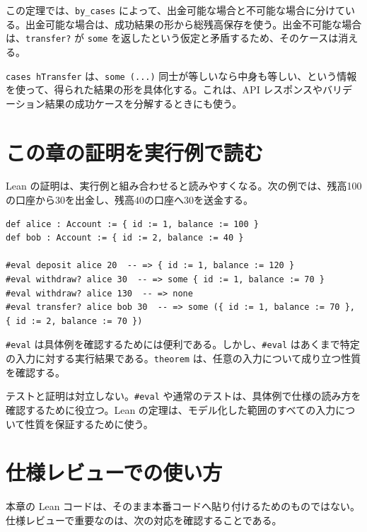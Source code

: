 この定理では、\texttt{by\_cases} によって、出金可能な場合と不可能な場合に分けている。出金可能な場合は、成功結果の形から総残高保存を使う。出金不可能な場合は、\texttt{transfer?} が \texttt{some} を返したという仮定と矛盾するため、そのケースは消える。

\begin{leanbox}
\texttt{cases hTransfer} は、\texttt{some (...)} 同士が等しいなら中身も等しい、という情報を使って、得られた結果の形を具体化する。これは、API レスポンスやバリデーション結果の成功ケースを分解するときにも使う。
\end{leanbox}

\section{この章の証明を実行例で読む}

Lean の証明は、実行例と組み合わせると読みやすくなる。次の例では、残高100の口座から30を出金し、残高40の口座へ30を送金する。

\begin{listing}[htbp]
\begin{verbatim}
def alice : Account := { id := 1, balance := 100 }
def bob : Account := { id := 2, balance := 40 }

#eval deposit alice 20  -- => { id := 1, balance := 120 }
#eval withdraw? alice 30  -- => some { id := 1, balance := 70 }
#eval withdraw? alice 130  -- => none
#eval transfer? alice bob 30  -- => some ({ id := 1, balance := 70 }, { id := 2, balance := 70 })
\end{verbatim}
\caption{実行例で仕様を読む}
\label{lst:ch19-eval-examples}
\end{listing}

\texttt{\#eval} は具体例を確認するためには便利である。しかし、\texttt{\#eval} はあくまで特定の入力に対する実行結果である。\texttt{theorem} は、任意の入力について成り立つ性質を確認する。

\begin{softwarebox}
テストと証明は対立しない。\texttt{\#eval} や通常のテストは、具体例で仕様の読み方を確認するために役立つ。Lean の定理は、モデル化した範囲のすべての入力について性質を保証するために使う。
\end{softwarebox}

\section{仕様レビューでの使い方}

本章の Lean コードは、そのまま本番コードへ貼り付けるためのものではない。仕様レビューで重要なのは、次の対応を確認することである。

